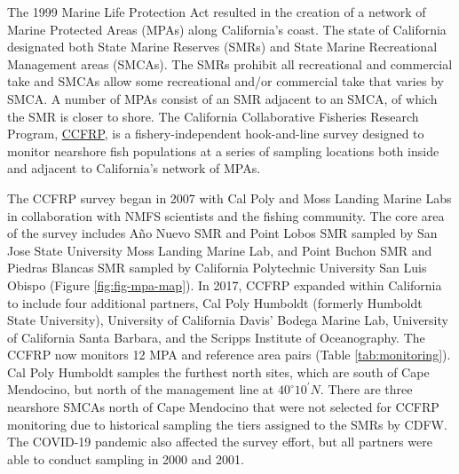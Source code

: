 \documentclass[
]{article}
\begin{document}
The 1999 Marine Life Protection Act resulted in the creation of a network of
Marine Protected Areas (MPAs) along California's coast. The state of California
designated both State Marine Reserves (SMRs) and State Marine Recreational
Management areas (SMCAs). The SMRs prohibit all recreational and commercial take
and SMCAs allow some recreational and/or commercial take that varies by SMCA.
A number of MPAs consist of an SMR adjacent to an SMCA, of which the SMR is closer to shore.
The California Collaborative Fisheries Research Program,
\href{https://www.mlml.calstate.edu/ccfrp/}{CCFRP},
is a fishery-independent hook-and-line survey designed to monitor nearshore fish
populations at a series of sampling locations both inside and adjacent to
California's network of MPAs.

The CCFRP survey began in 2007 with Cal Poly and Moss Landing Marine Labs
in collaboration with NMFS scientists and the fishing community. The core
area of the survey includes Año Nuevo SMR and Point Lobos SMR sampled by
San Jose State University Moss Landing Marine Lab, and Point Buchon SMR
and Piedras Blancas SMR sampled by California Polytechnic University
San Luis Obispo (Figure \ref{fig:fig-mpa-map}). In 2017, CCFRP expanded within
California to include four additional partners, Cal Poly Humboldt (formerly Humboldt State
University), University of California Davis' Bodega Marine Lab, University
of California Santa Barbara, and the Scripps Institute of Oceanography.
The CCFRP now monitors 12 MPA and reference area pairs (Table \ref{tab:monitoring}).
Cal Poly Humboldt samples the furthest north sites, which are south of Cape
Mendocino, but north of the management line at $40^\circ 10^\prime N$. There are three nearshore
SMCAs north of Cape Mendocino that
were not selected for CCFRP monitoring due to historical sampling the tiers
assigned to the SMRs by CDFW. The COVID-19 pandemic also affected the
survey effort, but all partners were able to conduct sampling in 2000 and 2001.
\end{document}
